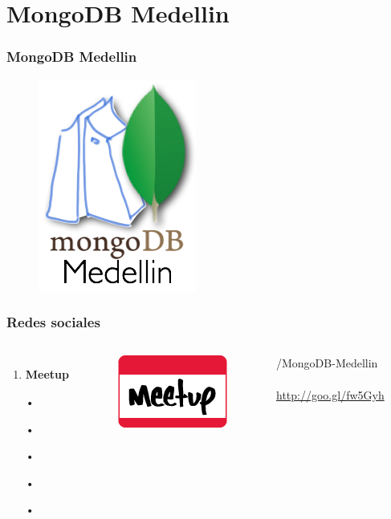 \documentclass{beamer}
\begin{document}
\section{MongoDB Medellin}
\begin{frame}
\frametitle{MongoDB Medellin}
\begin{figure}
\includegraphics[width=0.3\linewidth]{mongodbmedellin.png}
\end{figure}
\end{frame}
\begin{frame}
\frametitle{Redes sociales}
\begin{columns}[c] %

\begin{enumerate}
\item \textbf{Meetup}
\item[•]	
\item[•]	
\item[•]	
\item[•]	
\item[•]	
\end{enumerate}

\begin{figure}
\includegraphics[width=0.5\linewidth]{meetup.png}
\end{figure}
{\color{blue}/MongoDB-Medellin}
\\~\\
{\color{blue}\url{http://goo.gl/fw5Gyh}}
\end{columns}
\end{frame}
\end{document}
